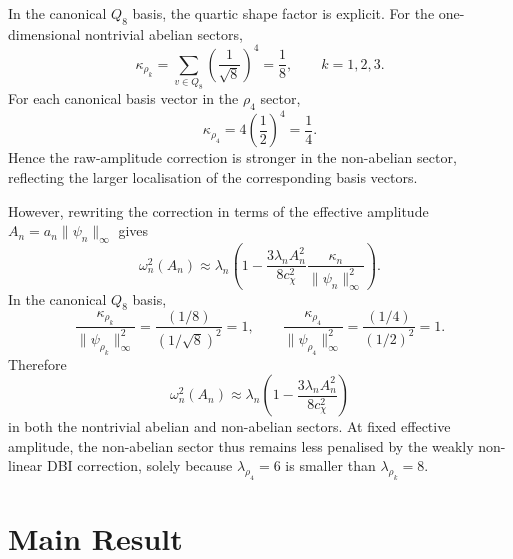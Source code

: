 \documentclass[11pt,a4paper]{article}
\begin{document}
    In the canonical $Q_8$ basis, the quartic shape factor is explicit.
    For the one-dimensional nontrivial abelian sectors,
    \begin{equation}
      \label{eq:kappa-abelian}
      \kappa_{\rho_k}
      =
      \sum_{v \in Q_8} \left(\frac{1}{\sqrt{8}}\right)^4
      =
      \frac{1}{8},
      \qquad
      k = 1,2,3.
    \end{equation}
    For each canonical basis vector in the $\rho_4$ sector,
    \begin{equation}
      \label{eq:kappa-nonabelian}
      \kappa_{\rho_4}
      =
      4 \left(\frac{1}{2}\right)^4
      =
      \frac{1}{4}.
    \end{equation}
    Hence the raw-amplitude correction is stronger in the non-abelian sector,
    reflecting the larger localisation of the corresponding basis vectors.

    However, rewriting the correction in terms of the effective amplitude
    $A_n = a_n\|\psi_n\|_\infty$ gives
    \begin{equation}
      \label{eq:omega-shift-effective}
      \omega_n^2(A_n)
      \approx
      \lambda_n
      \left(
        1
        - \frac{3\lambda_n A_n^2}{8c_\chi^2}
        \frac{\kappa_n}{\|\psi_n\|_\infty^2}
      \right).
    \end{equation}
    In the canonical $Q_8$ basis,
    \begin{equation}
      \frac{\kappa_{\rho_k}}{\|\psi_{\rho_k}\|_\infty^2}
      =
      \frac{(1/8)}{(1/\sqrt{8})^2}
      =
      1,
      \qquad
      \frac{\kappa_{\rho_4}}{\|\psi_{\rho_4}\|_\infty^2}
      =
      \frac{(1/4)}{(1/2)^2}
      =
      1.
    \end{equation}
    Therefore
    \begin{equation}
      \label{eq:omega-shift-effective-q8}
      \omega_n^2(A_n)
      \approx
      \lambda_n
      \left(
        1 - \frac{3\lambda_n A_n^2}{8c_\chi^2}
      \right)
    \end{equation}
    in both the nontrivial abelian and non-abelian sectors.
    At fixed effective amplitude, the non-abelian sector thus remains less penalised
    by the weakly non-linear DBI correction, solely because $\lambda_{\rho_4}=6$
    is smaller than $\lambda_{\rho_k}=8$.

  \section{Main Result}
\end{document}

